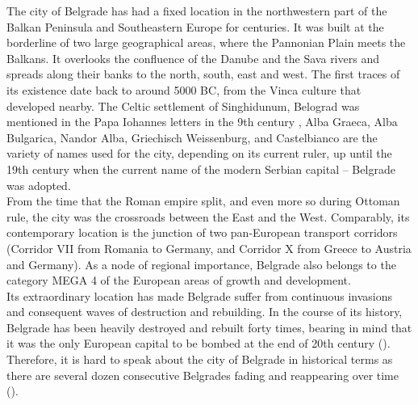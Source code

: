 \documentclass[11pt]{report}
\begin{document}
The city of Belgrade has had a fixed location in the northwestern part of the Balkan Peninsula and Southeastern Europe for centuries. It was built at the borderline of two large geographical areas, where the Pannonian Plain meets the Balkans. It overlooks the confluence of the Danube and the Sava rivers and spreads along their banks to the north, south, east and west. The first traces of its existence date back to around 5000 BC, from the Vinca culture that developed nearby. The Celtic settlement of Singhidunum, Belograd was mentioned in the Papa Iohannes letters in the 9th century , Alba Graeca, Alba Bulgarica, Nandor Alba, Griechisch Weissenburg, and Castelbianco are the variety of names used for the city, depending on its current ruler, up until the 19th century when the current name of the modern Serbian capital – Belgrade was adopted. 
\\

From the time that the Roman empire split, and even more so during Ottoman rule, the city was the crossroads between the East and the West. Comparably, its contemporary location is the junction of two pan-European transport corridors (Corridor VII from Romania to Germany, and Corridor X from Greece to Austria and Germany). As a node of regional importance, Belgrade also belongs to the category MEGA 4 of the European areas of growth and development.
\\

Its extraordinary location has made Belgrade suffer from continuous invasions and consequent waves of destruction and rebuilding. In the course of its history, Belgrade has been heavily destroyed and rebuilt forty times, bearing in mind that it was the only European capital to be bombed at the end of 20th century (\href{Doytchinov}{\citealt{doytchinov_belgrade_2015}}). Therefore, it is hard to speak about the city of Belgrade in historical terms as there are several dozen consecutive Belgrades fading and reappearing over time (\href{Grozdanic}{\citealt{grozdanic_belgrade_2008}}).
\\
\end{document}
